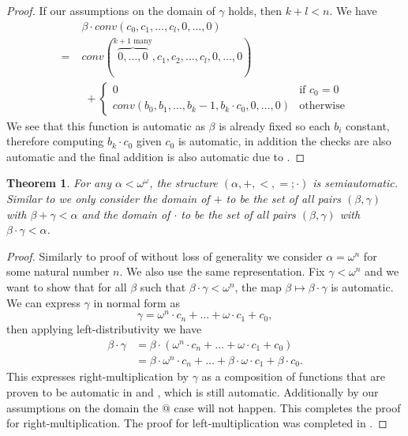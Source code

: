 \documentclass[british,a4paper,]{scrartcl}
\newtheorem{theorem}{Theorem}
\theoremstyle{definition}
\theoremstyle{remark}
\begin{document}
\begin{proof}
    If our assumptions on the domain of \(\gamma\) holds, then \(k+l < n\). We have
    \begin{align*}
         &\beta\cdot conv(c_0,c_1,\dots,c_l,0,\dots,0) \\
        =\; &conv(\overbrace{0,\dots,0}^{k+1\text{ many}}, c_1, c_2, \dots, c_l, 0, \dots, 0) \\
        &\; + \begin{cases}
            0 &\text{if } c_0 = 0 \\
            conv(b_0,b_1,\dots,b_k-1,b_k\cdot c_0,0,\dots,0) &\text{otherwise}
        \end{cases}
    \end{align*}
    We see that this function is automatic as \(\beta\) is already fixed so each \(b_i\) constant,
    therefore computing \(b_k\cdot c_0\) given \(c_0\) is automatic, in addition the checks are also automatic and
    the final addition is also automatic due to .
\end{proof}

\begin{theorem}
    For any \(\alpha < \omega^\omega\), the structure \((\alpha, +, <, =; \cdot)\) is semiautomatic.
    Similar to  we only consider
    the domain of \(+\) to be the set of all pairs \((\beta,\gamma)\) with \(\beta + \gamma < \alpha\) and
    the domain of \(\cdot\) to be the set of all pairs \((\beta,\gamma)\) with \(\beta \cdot \gamma < \alpha\).
\end{theorem}
\begin{proof}
    Similarly to proof of  without loss of generality we consider \(\alpha = \omega^n\) for some natural number \(n\).
    We also use the same representation.
    Fix \(\gamma<\omega^n\) and we want to show that for all \(\beta\) such that \(\beta\cdot\gamma < \omega^n\),
    the map \(\beta \mapsto \beta\cdot\gamma\) is automatic.
    We can express \(\gamma\) in normal form as
    \[ \gamma = \omega^n\cdot c_n + \dots + \omega\cdot c_1 + c_0, \]
    then applying left-distributivity we have
    \begin{align*}
        \beta\cdot\gamma
        &= \beta\cdot\left( \omega^n\cdot c_n + \dots + \omega\cdot c_1 + c_0  \right) \\
        &= \beta\cdot \omega^n\cdot c_n + \dots + \beta\cdot \omega\cdot c_1 + \beta\cdot c_0.
    \end{align*}
    This expresses right-multiplication by \(\gamma\) as a composition of functions that are proven to be automatic in
     and , which is still automatic.
    Additionally by our assumptions on the domain the \(@\) case will not happen.
    This completes the proof for right-multiplication.
    The proof for left-multiplication was completed in .
\end{proof}
\end{document}
